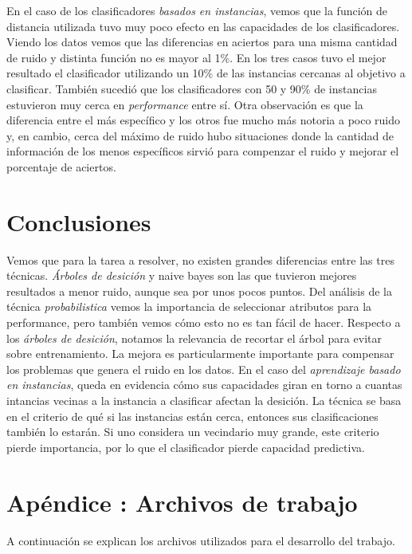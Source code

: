 \documentclass[a4paper,10pt]{article}
\begin{document}
En el caso de los clasificadores \emph{basados en instancias}, vemos que la función de distancia utilizada tuvo muy poco efecto en las capacidades de los clasificadores. Viendo los datos vemos que las diferencias en aciertos para una misma cantidad de ruido y distinta función no es mayor al 1\%. En los tres casos tuvo el mejor resultado el clasificador utilizando un 10\% de las instancias cercanas al objetivo a clasificar. También sucedió que los clasificadores con 50 y 90\% de instancias estuvieron muy cerca en \emph{performance} entre sí. Otra observación es que la diferencia entre el más específico y los otros fue mucho más notoria a poco ruido y, en cambio, cerca del máximo de ruido hubo situaciones donde la cantidad de información de los menos específicos sirvió para compenzar el ruido y mejorar el porcentaje de aciertos. 

\section{Conclusiones}

Vemos que para la tarea a resolver, no existen grandes diferencias entre las tres técnicas. \emph{Árboles de desición} y \textsf{naive bayes} son las que tuvieron mejores resultados a menor ruido, aunque sea por unos pocos puntos. Del análisis de la técnica \emph{probabilistica} vemos la importancia de seleccionar atributos para la performance, pero también vemos cómo esto no es tan fácil de hacer. Respecto a los \emph{árboles de desición}, notamos la relevancia de recortar el árbol para evitar sobre entrenamiento. La mejora es particularmente importante para compensar los problemas que genera el ruido en los datos. En el caso del \emph{aprendizaje basado en instancias}, queda en evidencia cómo sus capacidades giran en torno a cuantas intancias vecinas a la instancia a clasificar afectan la desición. La técnica se basa en el criterio de qué si las instancias están cerca, entonces sus clasificaciones también lo estarán. Si uno considera un vecindario muy grande, este criterio pierde importancia, por lo que el clasificador pierde capacidad predictiva.

\section{Apéndice : Archivos de trabajo}

A continuación se explican los archivos utilizados para el desarrollo del trabajo.
\end{document}
